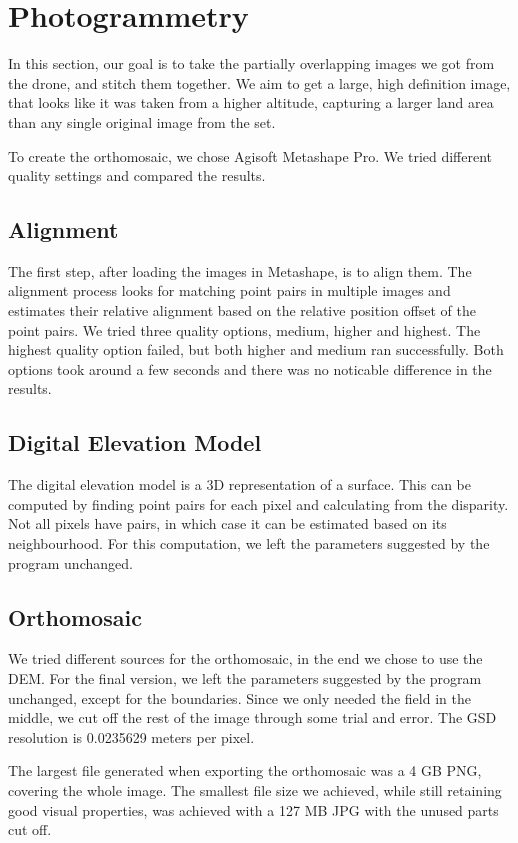 \documentclass[../Head/Main.tex]{subfiles}
\begin{document}
\section{Photogrammetry}\label{sec:photo}
In this section, our goal is to take the partially overlapping images we got from the drone, and stitch them together.
We aim to get a large, high definition image, that looks like it was taken from a higher altitude, 
capturing a larger land area than any single original image from the set.

To create the orthomosaic, we chose Agisoft Metashape Pro. 
We tried different quality settings and compared the results.

\subsection{Alignment}

The first step, after loading the images in Metashape, is to align them.
The alignment process looks for matching point pairs in multiple images and estimates their relative alignment based on the relative position offset of the point pairs.
We tried three quality options, medium, higher and highest.
The highest quality option failed, but both higher and medium ran successfully.
Both options took around a few seconds and there was no noticable difference in the results.

\subsection{Digital Elevation Model}
The digital elevation model is a 3D representation of a surface.
This can be computed by finding point pairs for each pixel and calculating from the disparity.
Not all pixels have pairs, in which case it can be estimated based on its neighbourhood.
For this computation, we left the parameters suggested by the program unchanged.

\subsection{Orthomosaic}
We tried different sources for the orthomosaic, in the end we chose to use the DEM.
For the final version, we left the parameters suggested by the program unchanged, except for the boundaries.
Since we only needed the field in the middle, we cut off the rest of the image through some trial and error.
The GSD resolution is 0.0235629 meters per pixel.

The largest file generated when exporting the orthomosaic was a 4 GB PNG, covering the whole image. 
The smallest file size we achieved, while still retaining good visual properties, was achieved with a 127 MB JPG with the unused parts cut off.
\end{document}
